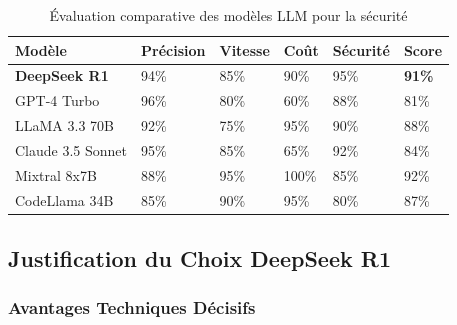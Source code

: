 \documentclass[12pt,a4paper]{report}
\begin{document}
\begin{table}[H]
    \centering
    \begin{tabularx}{\textwidth}{|X|X|X|X|X|X|}
        \hline
        \textbf{Modèle} & \textbf{Précision} & \textbf{Vitesse} & \textbf{Coût} & \textbf{Sécurité} & \textbf{Score} \\
        \hline
        \textbf{DeepSeek R1} & 94\% & 85\% & 90\% & 95\% & \textbf{91\%} \\
        \hline
        GPT-4 Turbo & 96\% & 80\% & 60\% & 88\% & 81\% \\
        \hline
        LLaMA 3.3 70B & 92\% & 75\% & 95\% & 90\% & 88\% \\
        \hline
        Claude 3.5 Sonnet & 95\% & 85\% & 65\% & 92\% & 84\% \\
        \hline
        Mixtral 8x7B & 88\% & 95\% & 100\% & 85\% & 92\% \\
        \hline
        CodeLlama 34B & 85\% & 90\% & 95\% & 80\% & 87\% \\
        \hline
    \end{tabularx}
    \caption{Évaluation comparative des modèles LLM pour la sécurité}
\end{table}

\subsection{Justification du Choix DeepSeek R1}

\subsubsection{Avantages Techniques Décisifs}
\end{document}
